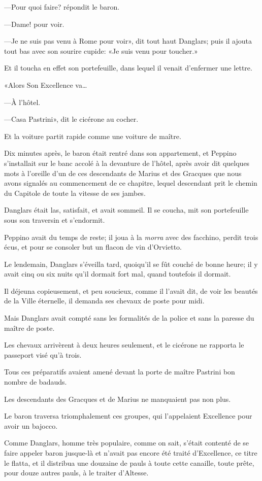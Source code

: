 —Pour quoi faire? répondit le baron. 

—Dame! pour voir. 

—Je ne suis pas venu à Rome pour voir», dit tout haut Danglars; puis il ajouta tout bas avec son sourire cupide: «Je suis venu pour toucher.» 

Et il toucha en effet son portefeuille, dans lequel il venait d'enfermer une lettre. 

«Alors Son Excellence va\dots 

—À l'hôtel. 

—Casa Pastrini», dit le cicérone au cocher. 

Et la voiture partit rapide comme une voiture de maître. 

Dix minutes après, le baron était rentré dans son appartement, et Peppino s'installait sur le banc accolé à la devanture de l'hôtel, après avoir dit quelques mots à l'oreille d'un de ces descendants de Marius et des Gracques que nous avons signalés au commencement de ce chapitre, lequel descendant prit le chemin du Capitole de toute la vitesse de ses jambes. 

Danglars était las, satisfait, et avait sommeil. Il se coucha, mit son portefeuille sous son traversin et s'endormit. 

Peppino avait du temps de reste; il joua à la \textit{morra} avec des facchino, perdit trois écus, et pour se consoler but un flacon de vin d'Orvietto. 

Le lendemain, Danglars s'éveilla tard, quoiqu'il se fût couché de bonne heure; il y avait cinq ou six nuits qu'il dormait fort mal, quand toutefois il dormait. 

Il déjeuna copieusement, et peu soucieux, comme il l'avait dit, de voir les beautés de la Ville éternelle, il demanda ses chevaux de poste pour midi. 

Mais Danglars avait compté sans les formalités de la police et sans la paresse du maître de poste. 

Les chevaux arrivèrent à deux heures seulement, et le cicérone ne rapporta le passeport visé qu'à trois. 

Tous ces préparatifs avaient amené devant la porte de maître Pastrini bon nombre de badauds. 

Les descendants des Gracques et de Marius ne manquaient pas non plus. 

Le baron traversa triomphalement ces groupes, qui l'appelaient Excellence pour avoir un bajocco. 

Comme Danglars, homme très populaire, comme on sait, s'était contenté de se faire appeler baron jusque-là et n'avait pas encore été traité d'Excellence, ce titre le flatta, et il distribua une douzaine de pauls à toute cette canaille, toute prête, pour douze autres pauls, à le traiter d'Altesse. 

